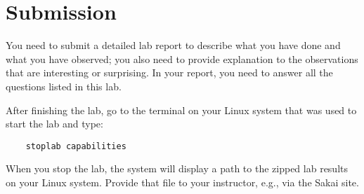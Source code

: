\section{Submission}

You need to submit a detailed lab report to describe what you have
done and what you have observed; you also need to provide explanation
to the observations that are interesting or surprising. In your report,
you need to answer all the questions listed in this lab.

After finishing the lab, go to the terminal on your Linux system that was used to start the lab and type:
\begin{verbatim}
    stoplab capabilities
\end{verbatim}
When you stop the lab, the system will display a path to the zipped lab results on your Linux system.  Provide that file to
your instructor, e.g., via the Sakai site.




